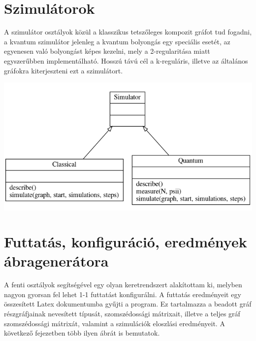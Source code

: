 \section{Szimulátorok}

A szimulátor osztályok közül a klasszikus tetszőleges kompozit gráfot tud
fogadni, a kvantum szimulátor jelenleg a kvantum bolyongás egy speciális
esetét, az egyenesen való bolyongást képes kezelni, mely a 2-regularitása miatt
egyszerűbben implementálható. Hosszú távú cél a k-reguláris, illetve az
általános gráfokra kiterjeszteni ezt a szimulátort.

\begin{center}
  \includegraphics[width=0.8\linewidth]{./figures/simulator.png}
\end{center}

\section{Futtatás, konfiguráció, eredmények ábragenerátora}

A fenti osztályok segítségével egy olyan keretrendszert alakítottam ki, melyben
nagyon gyorsan fel lehet 1-1 futtatást konfigurálni. A futtatás eredményeit egy
összesített Latex dokumentumba gyűjti a program. Ez tartalmazza a beadott gráf
részgráfjainak nevesített típusát, szomszédossági mátrixait, illetve a teljes
gráf szomszédossági mátrixát, valamint a szimulációk eloszlási eredményeit. A
következő fejezetben több ilyen ábrát is bemutatok.
